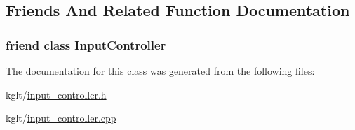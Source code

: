 \subsection{Friends And Related Function Documentation}
\hypertarget{classkglt_1_1_joypad_a083d5a8d8c2dd3a28d1f55d2965db0ab}{
\subsubsection[{Input\-Controller}]{\setlength{\rightskip}{0pt plus 5cm}friend class {\bf Input\-Controller}\hspace{0.3cm}{\ttfamily [friend]}}}\label{classkglt_1_1_joypad_a083d5a8d8c2dd3a28d1f55d2965db0ab}


The documentation for this class was generated from the following files\-:\begin{DoxyCompactItemize}
\item 
kglt/\hyperlink{input__controller_8h}{input\-\_\-controller.\-h}\item 
kglt/\hyperlink{input__controller_8cpp}{input\-\_\-controller.\-cpp}\end{DoxyCompactItemize}
